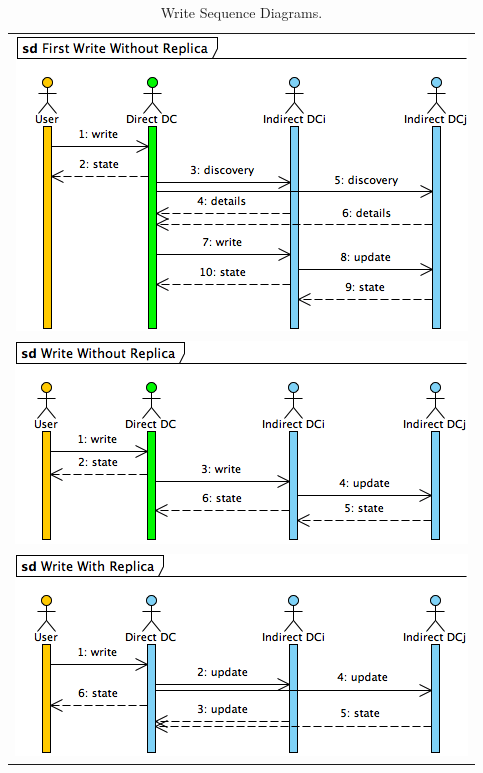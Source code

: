 \documentclass[english]{article}
\begin{document}
\begin{table}[htpb!]
	\begin{center}
		\begin{tabular}{c}
			\includegraphics[width=.94\textwidth]{figures/firstWriteWithoutReplica.png} \\
			\includegraphics[width=.96\textwidth]{figures/writeWithoutReplica.png} \\
			\includegraphics[width=.96\textwidth]{figures/writeWithReplica.png}
		\end{tabular}
		
		\caption{Write Sequence Diagrams.}
		\label{tb:write_sequence_diagrams}
	\end{center}
\end{table}
\end{document}
